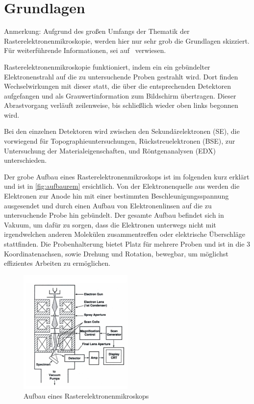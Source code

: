 \documentclass[12pt,english,ngerman]{scrartcl}
\begin{document}
\section{Grundlagen}

Anmerkung: Aufgrund des großen Umfangs der Thematik der
Rasterelektronenmikroskopie, werden hier nur sehr grob die Grundlagen
skizziert. Für weiterführende Informationen, sei auf~\cite{unterlagen}
verwiesen.

Rasterelektronenmikroskopie funktioniert, indem ein ein gebündelter
Elektronenstrahl auf die zu untersuchende Proben gestrahlt wird. Dort finden
Wechselwirkungen mit dieser statt, die über die entsprechenden Detektoren
aufgefangen und als Grauwertinformation zum Bildschirm übertragen. Dieser
Abrastvorgang verläuft zeilenweise, bis schließlich wieder oben links begonnen
wird.

Bei den einzelnen Detektoren wird zwischen den Sekundärelektronen (SE), die
vorwiegend für Topographieuntersuchungen, Rückstreuelektronen (BSE), zur
Untersuchung der Materialeigenschaften, und Röntgenanalysen (EDX)
unterschieden.

Der grobe Aufbau eines Rasterelektronenmikroskops ist im folgenden kurz erklärt
und ist in \autoref{fig:aufbaurem} ersichtlich. Von der Elektronenquelle aus
werden die Elektronen zur Anode hin mit einer bestimmten
Beschleunigungsspannung ausgesendet und durch einen Aufbau von Elektronenlinsen
auf die zu untersuchende Probe hin gebündelt. Der gesamte Aufbau befindet sich
in Vakuum, um dafür zu sorgen, dass die Elektronen unterwegs nicht mit
irgendwelchen anderen Molekülen zusammentreffen oder elektrische Überschläge
stattfinden. Die Probenhalterung bietet Platz für mehrere Proben und ist in die
3 Koordinatenachsen, sowie Drehung und Rotation, bewegbar, um möglichst
effizientes Arbeiten zu ermöglichen.~\cite{unterlagen}

\begin{figure}[]
	\begin{center}
		\includegraphics[width =0.5\textwidth]{./figures/aufbaurem.png}
	\end{center}
	\caption[Aufbau eines Rasterelektronenmikroskops]{Aufbau eines
		Rasterelektronenmikroskops~\cite{unterlagen}
	}\label{fig:aufbaurem}
\end{figure}
\end{document}
